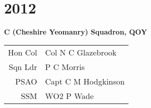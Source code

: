 \chapter*{2012}

\begin{center}
  \Large
  \textbf{C (Cheshire Yeomanry) Squadron, QOY}
\end{center}

\begin{center}
  \begin{tabular}{rl}
    Hon Col & Col N C Glazebrook \\
    Sqn Ldr & P C Morris \\
    PSAO & Capt C M Hodgkinson \\
    SSM & WO2 P Wade \\
  \end{tabular}
\end{center}
